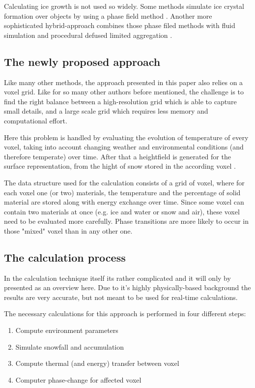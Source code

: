 Calculating ice growth is not used so widely. Some methods simulate ice crystal formation over objects by using a phase field method \cite{kim2003visual}. Another more sophisticated hybrid-approach combines those phase filed methods with fluid simulation and procedural defused limited aggregation \cite{kim2004hybrid}.

\subsection{The newly proposed approach}
Like many other methods, the approach presented in this paper \cite{benes2001layered} also relies on a voxel grid. Like for so many other authors before mentioned, the challenge is to find the right balance between a high-resolution grid which is able to capture small details, and a large scale grid which requires less memory and computational effort.

Here this problem is handled by evaluating the evolution of temperature of every voxel, taking into account changing weather and environmental conditions (and therefore temperate) over time. After that a heightfield is generated for the surface representation, from the hight of snow stored in the according voxel \cite{benes2001layered}.

The data structure used for the calculation consists of a grid of voxel, where for each voxel one (or two) materials, the temperature and the percentage of solid material are stored along with energy exchange over time. Since some voxel can contain two materials at once (e.g. ice and water or snow and air), these voxel need to be evaluated more carefully. Phase transitions are more likely to occur in those "mixed" voxel than in any other one.

\subsection{The calculation process}
In the calculation technique itself its rather complicated and it will only by presented as an overview here. Due to it's highly physically-based background the results are very accurate, but not meant to be used for real-time calculations.

The necessary calculations for this approach is performed in four different steps:
\begin{enumerate}
	\item Compute environment parameters
	\item Simulate snowfall and accumulation
	\item Compute thermal (and energy) transfer between voxel
	\item Computer phase-change for affected voxel
\end{enumerate}

